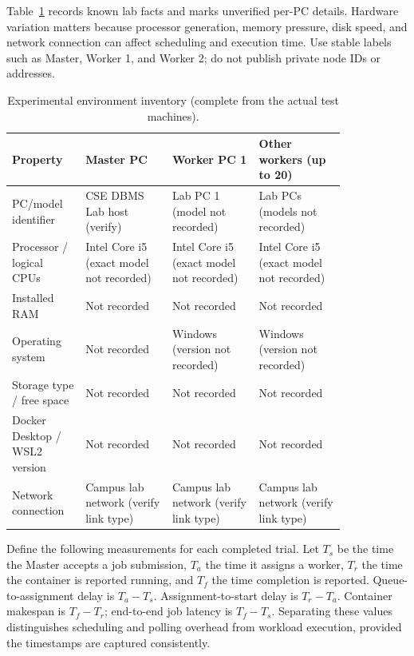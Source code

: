 \documentclass{article}
\begin{document}
Table~\ref{tab:environment} records known lab facts and marks unverified per-PC details. Hardware variation matters because processor generation, memory pressure, disk speed, and network connection can affect scheduling and execution time. Use stable labels such as Master, Worker 1, and Worker 2; do not publish private node IDs or addresses.
\begin{table}[h!]
\centering
\caption{Experimental environment inventory (complete from the actual test machines).}
\label{tab:environment}
\begin{tabular}{|p{0.17\linewidth}|p{0.22\linewidth}|p{0.22\linewidth}|p{0.22\linewidth}|}
\hline
Property & Master PC & Worker PC 1 & Other workers (up to 20) \\
\hline
PC/model identifier & CSE DBMS Lab host (verify) & Lab PC 1 (model not recorded) & Lab PCs (models not recorded) \\
\hline
Processor / logical CPUs & Intel Core i5 (exact model not recorded) & Intel Core i5 (exact model not recorded) & Intel Core i5 (exact model not recorded) \\
\hline
Installed RAM & Not recorded & Not recorded & Not recorded \\
\hline
Operating system & Not recorded & Windows (version not recorded) & Windows (version not recorded) \\
\hline
Storage type / free space & Not recorded & Not recorded & Not recorded \\
\hline
Docker Desktop / WSL2 version & Not recorded & Not recorded & Not recorded \\
\hline
Network connection & Campus lab network (verify link type) & Campus lab network (verify link type) & Campus lab network (verify link type) \\
\hline
\end{tabular}
\end{table}

Define the following measurements for each completed trial. Let \(T_s\) be the time the Master accepts a job submission, \(T_a\) the time it assigns a worker, \(T_r\) the time the container is reported running, and \(T_f\) the time completion is reported. Queue-to-assignment delay is \(T_a-T_s\). Assignment-to-start delay is \(T_r-T_a\). Container makespan is \(T_f-T_r\); end-to-end job latency is \(T_f-T_s\). Separating these values distinguishes scheduling and polling overhead from workload execution, provided the timestamps are captured consistently.
\end{document}
